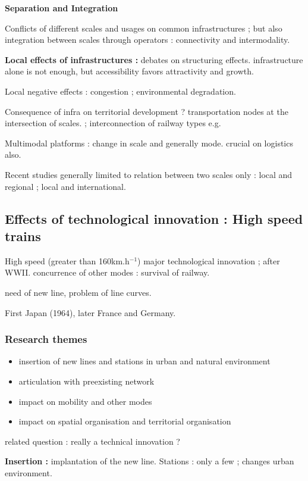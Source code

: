 \textbf{Separation and Integration}

Conflicts of different scales and usages on common infrastructures ; but also integration between scales through operators : connectivity and intermodality.

\textbf{Local effects of infrastructures : } debates on structuring effects. infrastructure alone is not enough, but accessibility favors attractivity and growth.

Local negative effects : congestion ; environmental degradation.

Consequence of infra on territorial development ? transportation nodes at the intersection of scales. ; interconnection of railway types e.g.

Multimodal platforms : change in scale and generally mode. crucial on logistics also.

Recent studies generally limited to relation between two scales only : local and regional ; local and international.


\subsection{Effects of technological innovation : High speed trains}

High speed (greater than 160km.h$^{-1}$) major technological innovation ; after WWII. concurrence of other modes : survival of railway.

need of new line, problem of line curves.

First Japan (1964), later France and Germany.


\subsubsection{Research themes}

\begin{itemize}
\item insertion of new lines and stations in urban and natural environment
\item articulation with preexisting network
\item impact on mobility and other modes
\item impact on spatial organisation and territorial organisation
\end{itemize}

related question : really a technical innovation ? 

\textbf{Insertion : } implantation of the new line. Stations : only a few ; changes urban environment.

